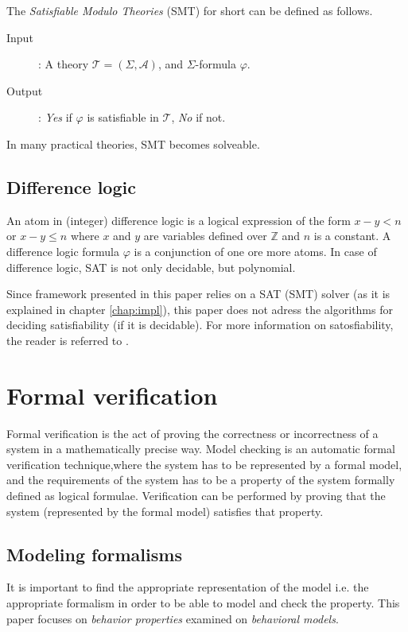 The \emph{Satisfiable Modulo Theories} (SMT) for short can be defined as follows.
\begin{description}
	\item[Input]: A theory $\mathcal{T}=(\Sigma,\mathcal{A})$, and $\Sigma$-formula $\varphi$.
	\item[Output]: \emph{Yes} if $\varphi$ is satisfiable in $\mathcal{T}$, \emph{No} if not.
\end{description}

In many practical theories, SMT becomes solveable.

\subsection{Difference logic}

An atom in (integer) difference logic is a logical expression of the form $x-y<n$ or $x-y \leq n$ where $x$ and $y$ are variables defined over $\mathds{Z}$ and $n$ is a constant. A difference logic formula $\varphi$ is a conjunction of one ore more atoms. In case of difference logic, SAT is not only decidable, but polynomial.

Since framework presented in this paper relies on a SAT (SMT) solver (as it is explained in chapter \ref{chap:impl}), this paper does not adress the algorithms for deciding satisfiability (if it is decidable). For more information on satosfiability, the reader is referred to .


\section{Formal verification}

Formal verification is the act of proving the correctness or incorrectness of a system in a mathematically precise way. Model checking is an automatic formal verification technique,where the system has to be represented by a formal model, and the requirements of the system has to be a property of the system formally defined as logical formulae. Verification can be performed by proving that the system (represented by the formal model) satisfies that property.

\subsection{Modeling formalisms}
It is important to find the appropriate representation of the model i.e. the appropriate formalism in order to be able to model and check the property. This paper focuses on \emph{behavior properties} examined on \emph{behavioral models}.

